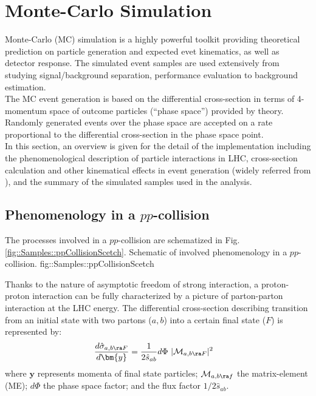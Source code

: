 \section{Monte-Carlo Simulation}
Monte-Carlo (MC) simulation is a highly powerful toolkit providing theoretical prediction on particle generation and expected evet kinematics, as well as detector response. The simulated event samples are used extensively from studying signal/background separation, performance evaluation to background estimation. \\

The MC event generation is based on the differential cross-section in terms of 4-momentum space of outcome particles (``phase space'') provided by theory. Randomly generated events over the phase space are accepted on a rate proportional to the differential cross-section in the phase space point. \\

In this section, an overview is given for the detail of the implementation including the phenomenological description of particle interactions in LHC, cross-section calculation and other kinematical effects in event generation (widely referred from \cite{ATLAS_generator}\cite{SkandsQCD}), and the summary of the simulated samples used in the analysis.  \\


\subsection{Phenomenology in a $pp$-collision}
The processes involved in a $pp$-collision are schematized in Fig. \ref{fig::Samples::ppCollisionScetch}.
{Schematic of involved phenomenology in a $pp$-collision.}
{fig::Samples::ppCollisionScetch}

Thanks to the nature of asymptotic freedom of strong interaction, a proton-proton interaction can be fully characterized by a picture of parton-parton interaction at the LHC energy. 
The differential cross-section describing transition from an initial state with two partons ($a, b$) into a certain final state ($F$) is represented by: 
\begin{align}
\frac{d\hat{\sigma}_{a,b \ra F}}{d\bm{y}} & = \frac{1}{2 \hat{s}_{ab}} d\Phi \,\, |\mathcal{M}_{a,b \ra F}|^2  
\label{ppXsec}
\end{align}
where $\bm{y}$ represents momenta of final state particles; $\mathcal{M}_{a,b \ra f}$ the matrix-element (ME); $d\Phi$ the phase space factor; and the flux factor $1/2\hat{s}_{ab}$.

